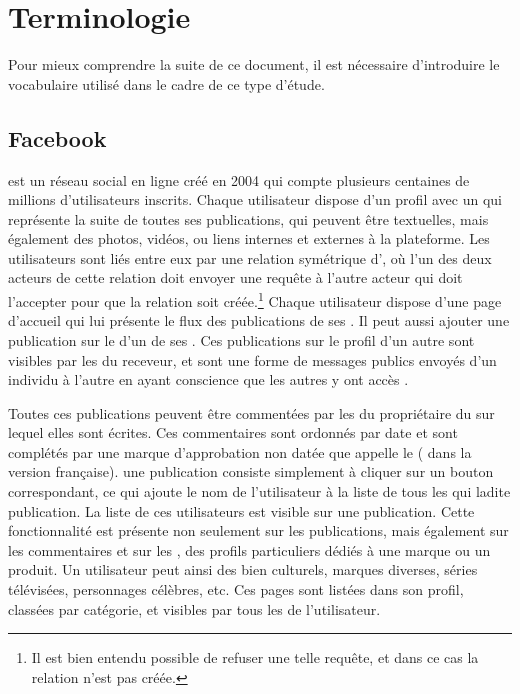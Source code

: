 
\section{\label{sec:terminologie}Terminologie}

Pour mieux comprendre la suite de ce document, il est nécessaire d’introduire
le vocabulaire utilisé dans le cadre de ce type d’étude.

\subsection{Facebook}

\fb{} est un réseau social en ligne créé en 2004 qui compte plusieurs
centaines de millions d’utilisateurs inscrits. Chaque utilisateur dispose d’un
profil avec un  qui représente la suite de toutes ses publications,
qui peuvent être textuelles, mais également des photos, vidéos, ou liens
internes et externes à la plateforme. Les utilisateurs sont liés entre eux par
une relation symétrique d’, où l’un des deux acteurs de cette
relation doit envoyer une requête à l’autre acteur qui doit l’accepter pour que
la relation soit créée.\footnote{Il est bien entendu possible de refuser une
telle requête, et dans ce cas la relation n’est pas créée.} Chaque utilisateur
dispose d’une page d’accueil qui lui présente le flux des publications de ses
. Il peut aussi ajouter une publication sur le  d’un de ses
. Ces publications sur le profil d’un autre sont visibles par les
 du receveur, et sont une forme de messages publics envoyés d’un
individu à l’autre en ayant conscience que les autres y ont accès
\citep{Walther2008}.

Toutes ces publications peuvent être commentées par les  du
propriétaire du  sur lequel elles sont écrites. Ces commentaires sont
ordonnés par date et sont complétés par une marque d’approbation non datée que
\fb{} appelle le  ( dans la version française).  une
publication consiste simplement à cliquer sur un bouton correspondant, ce qui
ajoute le nom de l’utilisateur à la liste de tous les  qui 
ladite publication. La liste de ces utilisateurs est visible sur une
publication. Cette fonctionnalité est présente non seulement sur les
publications, mais également sur les commentaires et sur les , des
profils particuliers dédiés à une marque ou un produit. Un utilisateur peut
ainsi  des bien culturels, marques diverses, séries télévisées,
personnages célèbres, etc. Ces pages sont listées dans son profil, classées par
catégorie, et visibles par tous les  de l’utilisateur.

